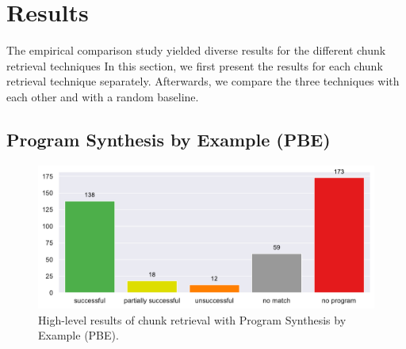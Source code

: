 \section{Results}
The empirical comparison study yielded diverse results for the
different chunk retrieval techniques
In this section, we first present the results for each chunk retrieval
technique separately.
Afterwards, we compare the three techniques with each other and with a
random baseline.

\subsection{Program Synthesis by Example (PBE)}
\label{sec:r:pbe}

\begin{figure}[tbp]
		\centering
		\includegraphics[width=\columnwidth,
		clip]{img/big-study/failure-reason-pbe.pdf}
		\caption{High-level results of chunk retrieval with
		Program Synthesis by Example (PBE).}
		\label{fig:failure-reason-PBE}
\end{figure}

